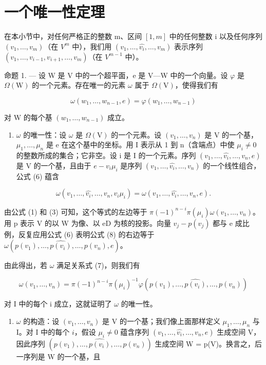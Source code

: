 \section{一个唯一性定理}

在本小节中，对任何严格正的整数 m、区间 \([1,m]\) 中的任何整数 i 以及任何序列 \((v_{1},\ldots,v_{m})\)（在 \(V^{m}\) 中），我们用 \((v_{1},\ldots,\widehat{v_{i}},\ldots,v_{m})\) 表示序列 \((v_{1},\ldots,v_{i-1},v_{i+1},\ldots,v_{m})\)（在 \(V^{m-1}\) 中）。

命题 1. --- 设 W 是 V 中的一个超平面，e 是 V---W 中的一个向量。设 \(\varphi\) 是 \(\Omega(\mathrm{W})\) 的一个元素。存在唯一的元素 \(\omega\) 属于 \(\Omega(\mathrm{V})\)，使得我们有

\[
\omega (w _ {1}, \ldots , w _ {n - 1}, e) = \varphi (w _ {1}, \ldots , w _ {n - 1})\tag{7}
\]

对 W 的每个基 \((w_{1},\ldots ,w_{n - 1})\) 成立。

\begin{enumerate}
\def\labelenumi{\Alph{enumi})}
\tightlist
\item
  \(\omega\) 的唯一性：设 \(\omega\) 是 \(\Omega(\mathrm{V})\) 的一个元素。设 \((v_{1},\ldots,v_{n})\) 是 V 的一个基，\(\mu_{1},\ldots,\mu_{n}\) 是 e 在这个基中的坐标。用 I 表示从 1 到 n（含端点）中使 \(\mu_{i}\neq0\) 的整数所成的集合；它非空。设 i 是 I 的一个元素。序列 \((v_{1},\ldots,\widehat{v_{i}},\ldots,v_{n},e)\) 是 V 的一个基，且由于 \(e-v_{i}\mu_{i}\) 是序列 \((v_{1},\ldots,\widehat{v_{i}},\ldots,v_{n})\) 的一个线性组合，公式 (6) 蕴含
\end{enumerate}

\[
\omega (v _ {1}, \ldots , \widehat {v _ {i}}, \ldots , v _ {n}, v _ {i} \mu_ {i}) = \omega (v _ {1}, \ldots , \widehat {v _ {i}}, \ldots , v _ {n}, e).\tag{8}
\]

由公式 (1) 和 (3) 可知，这个等式的左边等于 \(\pi(-1)^{n-i}\pi(\mu_i)\omega(v_1,\ldots,v_n)\)。用 p 表示 V 的以 W 为像、以 eD 为核的投影。向量 \(v_j - p(v_j)\) 都与 e 成比例，反复应用公式 (6) 表明公式 (8) 的右边等于 \(\omega(p(v_1),\ldots,\widehat{p(v_i)},\ldots,p(v_n),e)\)。

由此得出，若 \(\omega\) 满足关系式 (7)，则我们有

\[
\omega (v _ {1}, \dots , v _ {n}) = \pi (- 1) ^ {n - i} \pi (\mu_ {i}) ^ {- 1} \varphi (p (v _ {1}), \dots , \widehat {p (v _ {i})}, \dots , p (v _ {n}))\tag{9}
\]

对 I 中的每个 i 成立，这就证明了 \(\omega\) 的唯一性。

\begin{enumerate}
\def\labelenumi{\Alph{enumi})}
\setcounter{enumi}{1}
\tightlist
\item
  \(\omega\) 的构造：设 \((v_{1},\ldots,v_{n})\) 是 V 的一个基；我们像上面那样定义 \(\mu_{1},\ldots,\mu_{n}\) 与 I。对 I 中的每个 \(i\)，假设 \(\mu_{i}\neq0\) 蕴含序列 \((v_{1},\ldots,\widehat{v_{i}},\ldots,v_{n},e)\) 生成空间 V，因此序列 \((p(v_{1}),\ldots,\widehat{p(v_{i})},\ldots,p(v_{n}))\) 生成空间 W = p(V)。换言之，后一序列是 W 的一个基，且
\end{enumerate}

